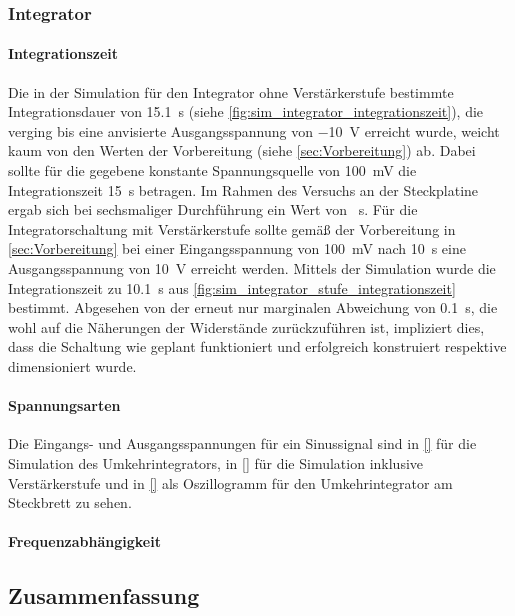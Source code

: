\documentclass[12pt,english,ngerman]{scrartcl}
\begin{document}
\subsubsection{Integrator}
\paragraph{Integrationszeit}
Die in der Simulation für den Integrator ohne Verstärkerstufe bestimmte
Integrationsdauer von \SI{15,1}{\second} (siehe
\autoref{fig:sim_integrator_integrationszeit}), die verging bis eine anvisierte
Ausgangsspannung von \SI{-10}{\volt} erreicht wurde, weicht kaum von den Werten
der Vorbereitung (siehe \autoref{sec:Vorbereitung}) ab. Dabei sollte für die
gegebene konstante Spannungsquelle von \SI{100}{\milli\volt} die
Integrationszeit \SI{15}{\second} betragen. Im Rahmen des Versuchs an der
Steckplatine ergab sich bei sechsmaliger Durchführung ein Wert von
\SI{}{\second}.
\newline
Für die Integratorschaltung mit Verstärkerstufe sollte gemäß der Vorbereitung
in \autoref{sec:Vorbereitung} bei einer Eingangsspannung von
\SI{100}{\milli\volt} nach \SI{10}{\second} eine Ausgangsspannung von
\SI{10}{\volt} erreicht werden. Mittels der Simulation wurde die
Integrationszeit zu \SI{10,1}{\second} aus
\autoref{fig:sim_integrator_stufe_integrationszeit} bestimmt. Abgesehen von der
erneut nur marginalen Abweichung von \SI{0,1}{\second}, die wohl auf die
Näherungen der Widerstände zurückzuführen ist, impliziert dies, dass die
Schaltung wie geplant funktioniert und erfolgreich konstruiert respektive
dimensioniert wurde.

\paragraph{Spannungsarten}
Die Eingangs- und Ausgangsspannungen für ein Sinussignal sind in \autoref{} für
die Simulation des Umkehrintegrators, in \autoref{} für die Simulation
inklusive Verstärkerstufe und in \autoref{} als Oszillogramm für den
Umkehrintegrator am Steckbrett zu sehen.

\paragraph{Frequenzabhängigkeit}




\subsection{Zusammenfassung}

\newpage

\printbibliography

\listoffigures

\listoftables
\end{document}
